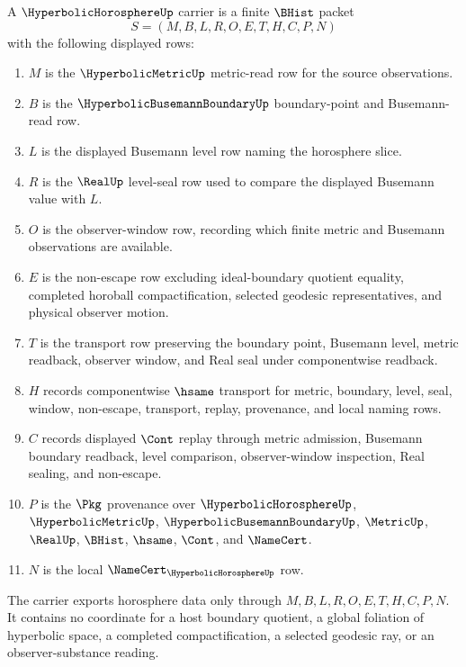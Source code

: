 \begin{definition}
\label{def:hyperbolic-horosphere-carrier}
A $\HyperbolicHorosphereUp$ carrier is a finite $\BHist$ packet
$$
S=(M,B,L,R,O,E,T,H,C,P,N)
$$
with the following displayed rows:
\begin{enumerate}
\item $M$ is the $\HyperbolicMetricUp$ metric-read row for the source observations.
\item $B$ is the $\HyperbolicBusemannBoundaryUp$ boundary-point and Busemann-read row.
\item $L$ is the displayed Busemann level row naming the horosphere slice.
\item $R$ is the $\RealUp$ level-seal row used to compare the displayed Busemann value with $L$.
\item $O$ is the observer-window row, recording which finite metric and Busemann observations are available.
\item $E$ is the non-escape row excluding ideal-boundary quotient equality, completed horoball compactification, selected geodesic representatives, and physical observer motion.
\item $T$ is the transport row preserving the boundary point, Busemann level, metric readback, observer window, and Real seal under componentwise readback.
\item $H$ records componentwise $\hsame$ transport for metric, boundary, level, seal, window, non-escape, transport, replay, provenance, and local naming rows.
\item $C$ records displayed $\Cont$ replay through metric admission, Busemann boundary readback, level comparison, observer-window inspection, Real sealing, and non-escape.
\item $P$ is the $\Pkg$ provenance over $\HyperbolicHorosphereUp$, $\HyperbolicMetricUp$, $\HyperbolicBusemannBoundaryUp$, $\MetricUp$, $\RealUp$, $\BHist$, $\hsame$, $\Cont$, and $\NameCert$.
\item $N$ is the local $\NameCert_{\HyperbolicHorosphereUp}$ row.
\end{enumerate}
The carrier exports horosphere data only through $M,B,L,R,O,E,T,H,C,P,N$. It contains no coordinate for a host boundary quotient, a global foliation of hyperbolic space, a completed compactification, a selected geodesic ray, or an observer-substance reading.
\end{definition}

